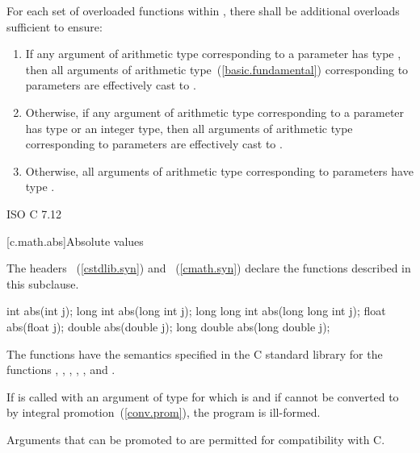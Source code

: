 \pnum
For each set of overloaded functions within ,
there shall be additional overloads sufficient to ensure:
\begin{enumerate}
  \item If any argument of arithmetic type
    corresponding to a  parameter
    has type ,
    then all arguments of arithmetic type~(\ref{basic.fundamental})
    corresponding to  parameters
    are effectively cast to .
  \item Otherwise, if any argument of arithmetic type
    corresponding to a  parameter
    has type 
    or an integer type,
    then all arguments of arithmetic type
    corresponding to  parameters
    are effectively cast to .
  \item Otherwise, all arguments of arithmetic type
    corresponding to  parameters
    have type .
\end{enumerate}

\xref
ISO C 7.12

[c.math.abs]{Absolute values}

\pnum
{}%
%
\begin{note}
The headers ~(\ref{cstdlib.syn}) and
~(\ref{cmath.syn})
declare the functions described in this subclause.
\end{note}

%
\begin{itemdecl}
int abs(int j);
long int abs(long int j);
long long int abs(long long int j);
float abs(float j);
double abs(double j);
long double abs(long double j);
\end{itemdecl}

\begin{itemdescr}
\pnum
\effects
The 
functions have the semantics specified in the C standard library
for the functions , , ,
, , and .

\pnum
\remarks
If  is called with an argument of type 
for which  is  and
if  cannot be converted to 
by integral promotion~(\ref{conv.prom}), the program is ill-formed.
\begin{note}
Arguments that can be promoted to  are permitted for compatibility with C.
\end{note}
\end{itemdescr}

